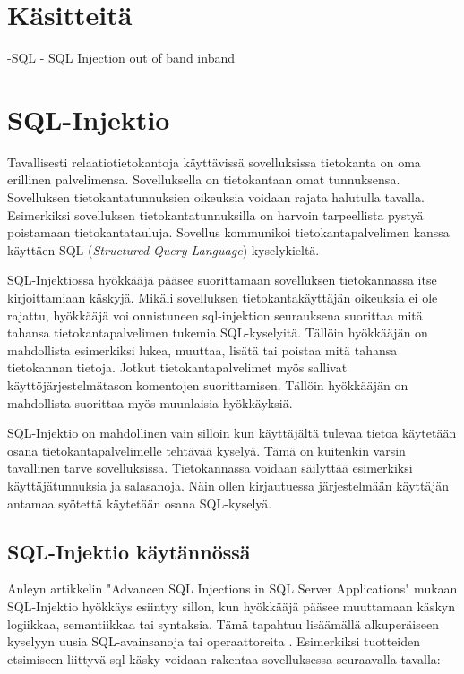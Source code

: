 \documentclass[finnish]{tktltiki2}
\theoremstyle{definition}
\theoremstyle{remark}
\begin{document}
	\section{Käsitteitä}
	-SQL
	- SQL Injection
	out of band
	inband
	\pagebreak
	
	
	
	\section{SQL-Injektio}
	Tavallisesti relaatiotietokantoja käyttävissä sovelluksissa tietokanta on oma erillinen palvelimensa. Sovelluksella on tietokantaan omat tunnuksensa. Sovelluksen tietokantatunnuksien oikeuksia voidaan rajata halutulla tavalla. Esimerkiksi sovelluksen tietokantatunnuksilla on harvoin tarpeellista pystyä poistamaan tietokantatauluja. Sovellus kommunikoi tietokantapalvelimen kanssa käyttäen SQL (\textit{Structured Query Language}) kyselykieltä.
	
	SQL-Injektiossa hyökkääjä pääsee suorittamaan sovelluksen tietokannassa itse kirjoittamiaan käskyjä. Mikäli sovelluksen tietokantakäyttäjän oikeuksia ei ole rajattu, hyökkääjä voi onnistuneen sql-injektion seurauksena suorittaa mitä tahansa tietokantapalvelimen tukemia SQL-kyselyitä. Tällöin hyökkääjän on mahdollista esimerkiksi lukea, muuttaa, lisätä tai poistaa mitä tahansa tietokannan tietoja. Jotkut tietokantapalvelimet myös sallivat käyttöjärjestelmätason komentojen suorittamisen. Tällöin hyökkääjän on mahdollista suorittaa myös muunlaisia hyökkäyksiä. 
	
	SQL-Injektio on mahdollinen vain silloin kun käyttäjältä tulevaa tietoa käytetään osana tietokantapalvelimelle tehtävää kyselyä. Tämä on kuitenkin varsin tavallinen tarve sovelluksissa. Tietokannassa voidaan säilyttää esimerkiksi käyttäjätunnuksia ja salasanoja. Näin ollen kirjautuessa järjestelmään käyttäjän antamaa syötettä käytetään osana SQL-kyselyä.
	
	\subsection{SQL-Injektio käytännössä}
	
	Anleyn artikkelin "Advancen SQL Injections in SQL Server Applications" mukaan SQL-Injektio hyökkäys esiintyy sillon, kun hyökkääjä pääsee muuttamaan käskyn logiikkaa, semantiikkaa tai syntaksia. Tämä tapahtuu lisäämällä alkuperäiseen kyselyyn uusia SQL-avainsanoja tai operaattoreita \cite{definition}. Esimerkiksi tuotteiden etsimiseen liittyvä sql-käsky voidaan rakentaa sovelluksessa seuraavalla tavalla:
	
\end{document}

